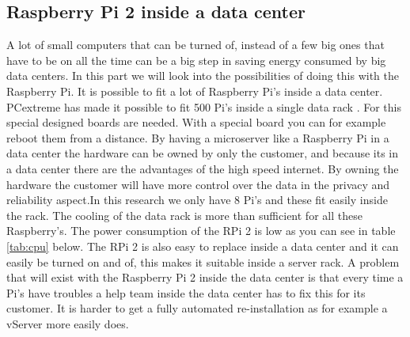 \documentclass{sig-alternate-br}
\begin{document}
\subsection{Raspberry Pi 2 inside a data center}

A lot of small computers that can be turned of, instead of a few big ones that have to be on all the time can be a big step in saving energy consumed by big data centers. In this part we will look into the possibilities of doing this with the Raspberry Pi. \newline
It is possible to fit a lot of Raspberry Pi's inside a data center. PCextreme has made it possible to fit 500 Pi's inside a single data rack \cite{Pcextreme}. For this special designed boards are needed. With a special board you can for example reboot them from a distance. By having a microserver like a Raspberry Pi in a data center the hardware can be owned by only the customer, and because its in a data center there are the advantages of the high speed internet. By owning the hardware the customer will have more control over the data in the privacy and reliability aspect.\newline In this research we only have 8 Pi's and these fit easily inside the rack. The cooling of the data rack is more than sufficient for all these Raspberry's. The power consumption of the RPi 2 is low as you can see in table \ref{tab:cpu} below. The RPi 2 is also easy to replace inside a data center and it can easily be turned on and of, this makes it suitable inside a server rack. A problem that will exist with the Raspberry Pi 2 inside the data center is that every time a Pi's have troubles a help team inside the data center has to fix this for its customer. It is harder to get  a fully automated re-installation as for example a vServer more easily does. 
\end{document}
